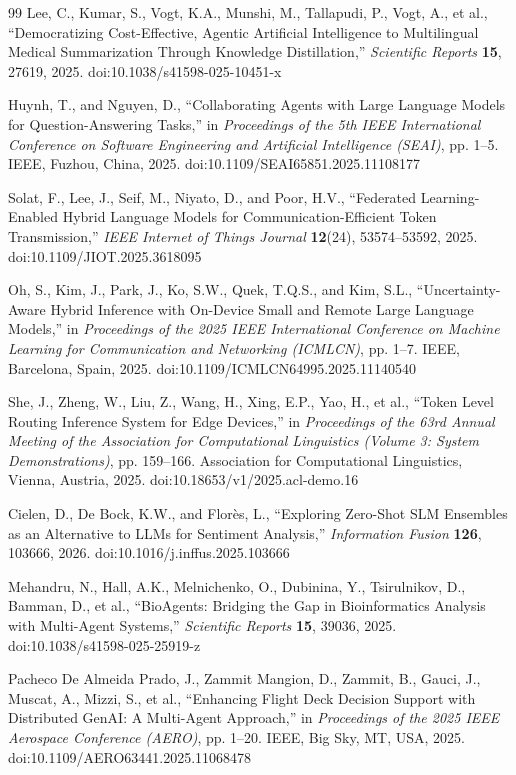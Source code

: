 \begin{thebibliography}{99}
Lee, C., Kumar, S., Vogt, K.A., Munshi, M., Tallapudi, P., Vogt, A., et al., ``Democratizing Cost-Effective, Agentic Artificial Intelligence to Multilingual Medical Summarization Through Knowledge Distillation,'' \textit{Scientific Reports} \textbf{15}, 27619, 2025. doi:10.1038/s41598-025-10451-x

Huynh, T., and Nguyen, D., ``Collaborating Agents with Large Language Models for Question-Answering Tasks,'' in \textit{Proceedings of the 5th IEEE International Conference on Software Engineering and Artificial Intelligence (SEAI)}, pp. 1--5. IEEE, Fuzhou, China, 2025. doi:10.1109/SEAI65851.2025.11108177

Solat, F., Lee, J., Seif, M., Niyato, D., and Poor, H.V., ``Federated Learning-Enabled Hybrid Language Models for Communication-Efficient Token Transmission,'' \textit{IEEE Internet of Things Journal} \textbf{12}(24), 53574--53592, 2025. doi:10.1109/JIOT.2025.3618095

Oh, S., Kim, J., Park, J., Ko, S.W., Quek, T.Q.S., and Kim, S.L., ``Uncertainty-Aware Hybrid Inference with On-Device Small and Remote Large Language Models,'' in \textit{Proceedings of the 2025 IEEE International Conference on Machine Learning for Communication and Networking (ICMLCN)}, pp. 1--7. IEEE, Barcelona, Spain, 2025. doi:10.1109/ICMLCN64995.2025.11140540

She, J., Zheng, W., Liu, Z., Wang, H., Xing, E.P., Yao, H., et al., ``Token Level Routing Inference System for Edge Devices,'' in \textit{Proceedings of the 63rd Annual Meeting of the Association for Computational Linguistics (Volume 3: System Demonstrations)}, pp. 159--166. Association for Computational Linguistics, Vienna, Austria, 2025. doi:10.18653/v1/2025.acl-demo.16

Cielen, D., De Bock, K.W., and Flor\`{e}s, L., ``Exploring Zero-Shot SLM Ensembles as an Alternative to LLMs for Sentiment Analysis,'' \textit{Information Fusion} \textbf{126}, 103666, 2026. doi:10.1016/j.inffus.2025.103666

Mehandru, N., Hall, A.K., Melnichenko, O., Dubinina, Y., Tsirulnikov, D., Bamman, D., et al., ``BioAgents: Bridging the Gap in Bioinformatics Analysis with Multi-Agent Systems,'' \textit{Scientific Reports} \textbf{15}, 39036, 2025. doi:10.1038/s41598-025-25919-z

Pacheco De Almeida Prado, J., Zammit Mangion, D., Zammit, B., Gauci, J., Muscat, A., Mizzi, S., et al., ``Enhancing Flight Deck Decision Support with Distributed GenAI: A Multi-Agent Approach,'' in \textit{Proceedings of the 2025 IEEE Aerospace Conference (AERO)}, pp. 1--20. IEEE, Big Sky, MT, USA, 2025. doi:10.1109/AERO63441.2025.11068478

\end{thebibliography}
